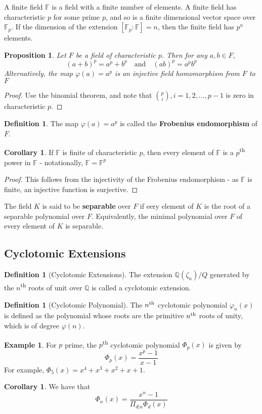 \documentclass[10pt, oneside, reqno]{amsart}
\theoremstyle{plain}%
\newtheorem{prop}[thm]{Proposition}
\theoremstyle{definition}
\newtheorem{defn}[thm]{Definition}
\newtheorem{exmp}[thm]{Example}
\newtheorem{cor}[thm]{Corollary}
\theoremstyle{remark}
\newcommand{\Q}{\mathbb{Q}}
\newcommand{\F}{\mathbb{F}}
\newcommand{\nth}{n\textsuperscript{th}}
\newcommand{\xdeg}[2]{[#1 : #2]}
\begin{document}
A finite field  $\F$ is a field with a finite number of elements.  A finite field has characteristic $p$ for some prime $p$, and so is a finite dimensional vector space over $\F_p$. If the dimension of the extension $\xdeg{\F_p}{\F} = n$, then the finite field has $p^n$ elements.
\begin{prop}
    Let $F$ be a field of characteristic $p$. Then for any $a,b \in F$,\[
        (a+b)^p = a^p + b^p \quad \text{and} \quad (ab)^p = a^p b^p
    \]
    Alternatively, the map $\varphi(a) = a^p$ is an injective field homomorphism from $F$ to $F$
\end{prop}
\begin{proof}
    Use the binomial theorem, and note that ${p \choose i}, i = 1,2,\dots,p-1$ is zero in characteristic $p$.
\end{proof}
\begin{defn}
    The map $\varphi(a) = a^p$ is called the \textbf{Frobenius endomorphism} of $F$.
\end{defn}

\begin{cor}
    If $\F$ is finite of characteristic $p$, then every element of $\F$ is a $p$\textsuperscript{th} power in $\F$ - notationally, $\F = \F^p$
\end{cor}
\begin{proof}
    This follows from the injectivity of the Frobenius endomorphism - as $\F$ is finite, an injective function is surjective.
\end{proof}

The field $K$ is said to be \textbf{separable} over $F$ if eery element of $K$ is the root of a separable polynomial over $F$.  Equivalently, the minimal polynomial over $F$ of every element of $K$ is separable.





\subsection{Cyclotomic Extensions} %
\label{sub:cyclotomic_extensions}
\begin{defn}[Cyclotomic Extensions]
    The extension $\Q(\zeta_n)/Q$ generated by the $n$\textsuperscript{th} roots of unit over $\Q$ is called a cyclotomic extension.
\end{defn}

\begin{defn}[Cyclotomic Polynomial]
    The $\nth$ cyclotomic polynomial $\varphi_n(x)$ is defined as the polynomial whose roots are the primitive $\nth$ roots of unity, which is of degree $\varphi(n)$.  
\end{defn}
\begin{exmp}
    For $p$ prime, the $p$\textsuperscript{th} cyclotomic polynomial $\Phi_p(x)$ is given by \[
        \Phi_p(x) = \frac{x^p - 1}{x-1}
    \] 
    For example, $\Phi_5(x) = x^4 + x^3 + x^2 + x + 1$.
\end{exmp}
\begin{cor}
    We have that \[
        \Phi_n(x) = \frac{x^n - 1}{\Pi_{d|n} \Phi_d(x)}
    \]
\end{cor}
\end{document}

